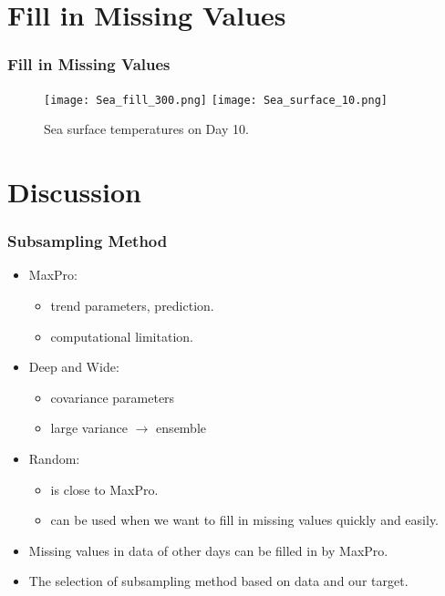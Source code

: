 \documentclass{beamer}
\begin{document}
\section{Fill in Missing Values}
\begin{frame}
\frametitle{Fill in Missing Values}
\begin{figure}
  \centering
  \texttt{[image: Sea\_fill\_300.png]}
  \texttt{[image: Sea\_surface\_10.png]}\\
  \caption{Sea surface temperatures on Day 10.}\label{Figure 7}
\end{figure}
\end{frame}

\section{Discussion}
\begin{frame}
\frametitle{Subsampling Method}
\begin{itemize}
\item MaxPro: 
\begin{itemize}
\item trend parameters, prediction.
\item computational limitation.
\end{itemize}
\item Deep and Wide:
\begin{itemize}
\item covariance parameters 
\item large variance $\to$ ensemble
\end{itemize}
\item Random:
\begin{itemize}
\item is close to MaxPro.
\item can be used when we want to fill in missing values quickly and easily.
\end{itemize}
\item Missing values in data of other days can be filled in by MaxPro.
\item The selection of subsampling method based on data and our target.
\end{itemize}
\end{frame}


\end{document}
